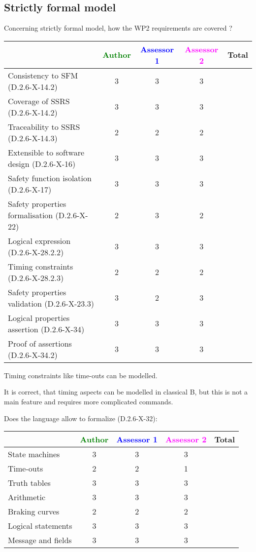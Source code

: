 \subsection{Strictly formal model}

Concerning strictly formal model, how the WP2 requirements are covered ?

\begin{tabular}{|l | c | c | c | c|}
\hline
& \textcolor{green}{Author} & \textcolor{blue}{Assessor 1} & \textcolor{magenta}{Assessor 2} & Total \\
\hline 
Consistency to SFM (D.2.6-X-14.2) & 3 & 3 & 3 &  \\
\hline
Coverage of SSRS (D.2.6-X-14.2)  & 3 & 3 & 3 &  \\
\hline
Traceability to  SSRS (D.2.6-X-14.3)  & 2 & 2 & 2 &  \\
\hline
Extensible to software design (D.2.6-X-16)  & 3 & 3 & 3 &  \\
\hline
Safety function isolation (D.2.6-X-17)  & 3 & 3 & 3 &  \\
\hline 
Safety properties formalisation (D.2.6-X-22)  & 2 & 3 & 2 &  \\
\hline
Logical expression (D.2.6-X-28.2.2)  & 3 & 3 & 3 &  \\
\hline
Timing constraints (D.2.6-X-28.2.3)  & 2 & 2 & 2 &  \\
\hline
Safety properties validation (D.2.6-X-23.3)  & 3 & 2 & 3 &  \\
\hline
Logical properties assertion (D.2.6-X-34)  & 3 & 3 & 3 &  \\
\hline
Proof of assertions (D.2.6-X-34.2)  & 3 & 3 & 3 &  \\
\hline
\end{tabular}



\begin{author_comment}
Timing constraints like time-outs can be modelled.
\end{author_comment}


\begin{assessor2}
It is correct, that timing aspects can be modelled in classical B, but this is not a main feature and requires more complicated commands.
\end{assessor2}

Does the language allow to  formalize (D.2.6-X-32):

\begin{tabular}{|l | c | c | c | c|}
\hline
& \textcolor{green}{Author} & \textcolor{blue}{Assessor 1} & \textcolor{magenta}{Assessor 2} & Total \\
\hline 
State machines  & 3 & 3 & 3 &  \\
\hline
Time-outs  & 2 & 2 & 1 &  \\
\hline
Truth tables  & 3 & 3 & 3 &  \\
\hline
Arithmetic  & 3 & 3 & 3 &  \\
\hline
Braking curves  & 2 & 2 & 2 &  \\
\hline
Logical statements & 3 & 3 & 3  &  \\
\hline
Message and fields & 3 & 3 & 3 &  \\
\hline
\end{tabular}


